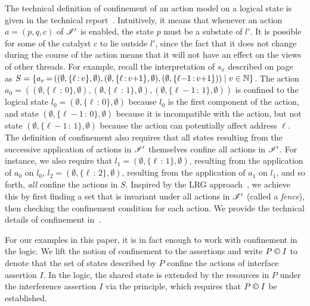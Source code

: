 The technical definition of confinement of an action model on a
logical state is given in the technical report~\cite{.}. Intuitively,
it means that whenever an action $a = (p, q, c)$ of
$\mathscr{I}'$ is enabled, the state $p$ must be a substate of $l'$.  It is
possible for some of the catalyst $c$ to lie outside $l'$, since the
fact that it does not change during the course of the action means
that it will not have an effect on the views of other threads.
For example, recall the interpretation of $s_x$ described on
page~\pageref{ex:sxsem} as $S=\{a_v \,{=}\, ((\emptyset, \{\ell\,{:}\,v\}, \emptyset), (\emptyset, \{\ell\,{:}\,v{+}1\}, \emptyset), (\emptyset, \{\ell{-}1\,{:}\,v{+}1\})) \mid v \in \mathbb{N}\}$. The action $a_0 = ((\emptyset, \{\ell\,{:}\,0\},
\emptyset), (\emptyset, \{\ell\,{:}\,1\}, \emptyset), (\emptyset,
\{\ell{-}1\,{:}\,1\}, \emptyset))$ is confined to the logical state
$l_0=(\emptyset, \{\ell\,{:}\,0\}, \emptyset)$ because $l_0$ is the first component of the
action, and state $(\emptyset, \{\ell{-}1\,{:}\,0\}, \emptyset)$
because it  is incompatible with the
action, but not state $(\emptyset, \{\ell{-}1\,{:}\,1\}, \emptyset)$ because the action can
potentially affect address $\ell$.
%
The definition of confinement also requires that all states resulting from the successive application of actions in $\mathscr{I}'$ themselves confine all actions in $\mathscr{I}'$. For instance, we also require that $l_1 = (\emptyset, \{\ell\,{:}\,1\}, \emptyset)$,  resulting from the application of $a_0$ on $l_0$, $l_2 = (\emptyset, \{\ell\,{:}\,2\}, \emptyset)$, resulting from the application of $a_1$ on $l_1$, and so forth, \emph{all} confine the actions in $S$. 
Inspired by the LRG approach~\cite{lrg}, we achieve this by
first finding a set that is invariant under all actions in $\mathscr{I}'$
(called a \emph{fence}), then checking the confinement condition for
each action. We provide the technical details of confinement in~\cite{colosl-tr14}.

For our examples in this paper, it is in fact enough to work with confinement in the
logic. We lift the notion of confinement to the assertions and write
$P \confines I$ to denote that the set of states described by $P$
 confine the actions of interface assertion $I$.  In the logic, the shared state is extended by the resources in
$P$ under the interference assertion $I$ via the \extendRule principle,
which requires that $P\containI I$ be
established. 



